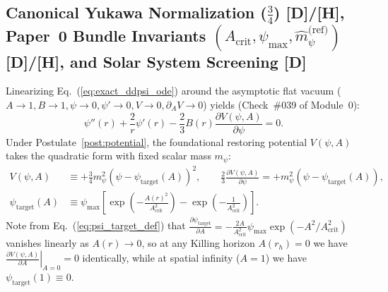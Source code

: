 \documentclass[11pt,a4paper]{article}
\newcommand{\catD}{\textbf{\textcolor{blue!75!black}{[D]}}}
\newcommand{\catH}{\textbf{\textcolor{orange!85!black}{[H]}}}
\theoremstyle{definition}
\theoremstyle{remark}
\begin{document}
\subsection{\texorpdfstring{Canonical Yukawa Normalization ($\frac{3}{4}$) \catD/\catH, Paper~0 Bundle Invariants $(A_{\text{crit}}, \psi_{\max}, \hat{m}_{\psi}^{\text{(ref)}})$ \catD/\catH, and Solar System Screening \catD}{Canonical Yukawa Normalization, Paper 0 Bundle Invariants, and Solar System Screening}}

Linearizing Eq.~(\ref{eq:exact_ddpsi_ode}) around the asymptotic flat vacuum ($A \to 1, B \to 1, \psi \to 0, \psi' \to 0, V \to 0, \partial_A V \to 0$) yields (Check~\#039 of Module~0):
\begin{equation}
  \psi''(r) + \frac{2}{r}\psi'(r) - \frac{2}{3}B(r)\frac{\partial V(\psi,A)}{\partial\psi} = 0.
  \label{eq:linearized_ddpsi_exact}
\end{equation}
Under Postulate~\ref{post:potential}, the foundational restoring potential $V(\psi,A)$ takes the quadratic form with fixed scalar mass $m_{\psi}$:
\begin{align}
  V(\psi, A) &\equiv +\frac{3}{4}m_{\psi}^2\left(\psi - \psi_{\text{target}}(A)\right)^2, \qquad \frac{2}{3}\frac{\partial V(\psi,A)}{\partial\psi} = +m_{\psi}^2\left(\psi - \psi_{\text{target}}(A)\right), \label{eq:v_yukawa_threshold} \\[4pt]
  \psi_{\text{target}}(A) &\equiv \psi_{\max}\left[\exp\!\left(-\frac{A(r)^2}{A_{\text{crit}}^2}\right) - \exp\!\left(-\frac{1}{A_{\text{crit}}^2}\right)\right]. \label{eq:psi_target_def}
\end{align}
Note from Eq.~(\ref{eq:psi_target_def}) that $\frac{\partial\psi_{\text{target}}}{\partial A} = -\frac{2 A}{A_{\text{crit}}^2}\psi_{\max}\exp(-A^2/A_{\text{crit}}^2)$ vanishes linearly as $A(r) \to 0$, so at any Killing horizon $A(r_h) = 0$ we have $\left.\frac{\partial V(\psi,A)}{\partial A}\right|_{A=0} = 0$ identically, while at spatial infinity ($A = 1$) we have $\psi_{\text{target}}(1) \equiv 0$.
\end{document}
